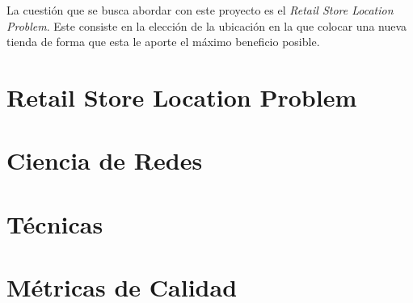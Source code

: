 
La cuestión que se busca abordar con este proyecto es el \textit{Retail Store Location Problem}. Este consiste
en la elección de la ubicación en la que colocar una nueva tienda de forma que esta le aporte el máximo beneficio posible.

\section{Retail Store Location Problem}





\section{Ciencia de Redes}


\section{Técnicas}

\section{Métricas de Calidad}









